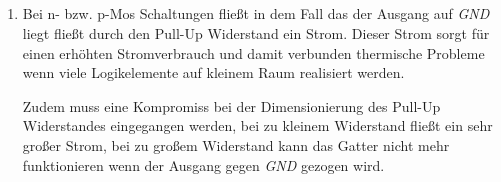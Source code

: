 \documentclass[DIN, pagenumber=false, fontsize=11pt, parskip=half]{scrartcl}
\begin{document}
    \subsection{}
    \begin{enumerate}[label = (\alph*)]
        \item Bei n- bzw. p-Mos Schaltungen fließt in dem Fall das der Ausgang auf
            \textit{GND} liegt fließt durch den Pull-Up Widerstand ein Strom.
            Dieser Strom sorgt für einen erhöhten Stromverbrauch und damit verbunden
            thermische Probleme wenn viele Logikelemente auf kleinem Raum realisiert werden.

            Zudem muss eine Kompromiss bei der Dimensionierung des Pull-Up Widerstandes
            eingegangen werden, bei zu kleinem Widerstand fließt ein sehr großer Strom,
            bei zu großem Widerstand kann das Gatter nicht mehr funktionieren wenn
            der Ausgang gegen \textit{GND} gezogen wird.


\end{enumerate}
\end{document}
